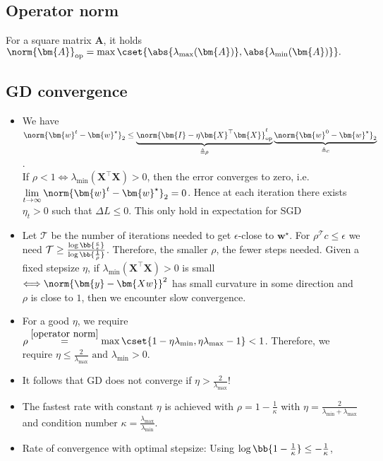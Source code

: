 %
\subsection{Operator norm} \label{operator norm}
For a square matrix $\bm{A}$, it holds
  $\norm{\bm{A}}_{\text{op}} = \max\cset{\abs{\lambda_{\max}(\bm{A})}, \abs{\lambda_{\min}(\bm{A})}}.$

\subsection{GD convergence}
\begin{itemize}
\item
We have $\norm{\bm{w}^{t} - \bm{w}^{\star}}_{2} \leq \underbrace{\norm{\bm{I} - \eta
\bm{X}^{\top}\bm{X}}_{\text{op}}^{t}}_{\triangleq \rho}\underbrace{\norm{\bm{w}^{0} - \bm{w}^{\star}}_{2}}_{\triangleq c}$. \\
If $\rho < 1 \Longleftrightarrow \lambda_{\min}(\bm{X}^{\top}\bm{X}) > 0$,
then the error converges to zero, i.e. $\lim\limits_{t \rightarrow \infty}\norm{\bm{w}^{t} - \bm{w}^{\star}}_{2} = 0$.
Hence at each iteration there exists $\eta_{t} >0$ such that $\Delta L \leq 0$. This only hold in expectation for SGD
\item
Let $\mathcal{T}$ be the number of iterations needed to get $\epsilon$-close to $\bm{w}^{\star}$.
    For $\rho^{\mathcal{T}}c \leq \epsilon$ we need $\mathcal{T} \geq \frac{\log\bb{\frac{c}{\epsilon}}}
    {\log\bb{\frac{1}{\rho}}}$. Therefore, the smaller $\rho$, the fewer steps needed.
    Given a fixed stepsize $\eta$, if $\lambda_{\min}(\bm{X}^{\top}\bm{X}) > 0$ is small
    $\Longleftrightarrow \norm{\bm{y} - \bm{Xw}}^{2}$ has small curvature in some direction and $\rho$ is close to
    $1$, then we encounter slow convergence.
\item
For a good $\eta$, we require $\rho \overset{\ref{operator norm}}{=}\max\cset{1 - \eta \lambda_{\min},
    \eta\lambda_{\max}-1} < 1$. Therefore, we require $\eta \leq \frac{2}{\lambda_{\max}}
    \text{ and } \lambda_{\min} > 0$.
\item
It follows that GD does not converge if $\eta > \frac{2}{\lambda_{\max}}$!
\item
The fastest rate with constant $\eta$ is achieved with $\rho = 1 - \frac{1}{\kappa}$ with
$\eta = \frac{2}{\lambda_{\min} + \lambda_{\max}}$ and condition number $\kappa = \frac{\lambda_{\max}}{\lambda_{\min}}$.
\item
Rate of convergence with optimal stepsize: Using $\log\bb{1-\frac{1}{\kappa}}\leq -\frac{1}{\kappa}$,

\end{itemize}
